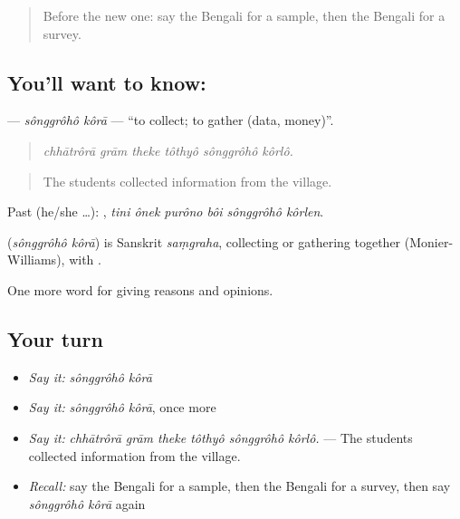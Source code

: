 \begin{quote}
Before the new one: say the Bengali for a sample, then the Bengali for a survey.
\end{quote}

\subsection*{You'll want to know:  }
\textbf{ } — \emph{sônggrôhô kôrā} — \textquotedblleft{}to collect; to gather (data, money)\textquotedblright{}.

\begin{quote}
     
\end{quote}

\begin{quote}
\emph{chhātrôrā grām theke tôthyô sônggrôhô kôrlô.}
\end{quote}

\begin{quote}
The students collected information from the village.
\end{quote}

Past (he/she …):      , \emph{tini ônek purôno bôi sônggrôhô kôrlen}.

\begin{cousinweb}
\textbf{ } (\emph{sônggrôhô kôrā}) is Sanskrit \emph{saṃgraha}, collecting or gathering together (Monier-Williams), with .
\end{cousinweb}

\begin{grammarlens}[title={What you've built}]
One more word for giving reasons and opinions.
\end{grammarlens}

\subsection*{Your turn}
\begin{itemize}
\raggedright
  \item \emph{Say it:} \emph{sônggrôhô kôrā}
  \item \emph{Say it:} \emph{sônggrôhô kôrā}, once more
  \item \emph{Say it:} \emph{chhātrôrā grām theke tôthyô sônggrôhô kôrlô.} — The students collected information from the village.
  \item \emph{Recall:} say the Bengali for a sample, then the Bengali for a survey, then say \emph{sônggrôhô kôrā} again
\end{itemize}

